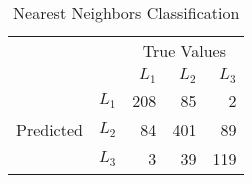 \begin{table}
\centering
  \caption{Nearest Neighbors Classification}
  \begin{tabular}{rrrrr}
    \toprule
    & &\multicolumn{3}{c}{True Values}\\
    & & ${L_1}$ & ${L_2}$ & ${L_3}$ \\
    \multirow{3}{*}{Predicted} & ${L_1}$ & 208 & 85 & 2 \\
    & ${L_2}$ & 84 & 401 & 89 \\
    & ${L_3}$ & 3 & 39 & 119 \\\bottomrule
  \end{tabular}
\end{table}
